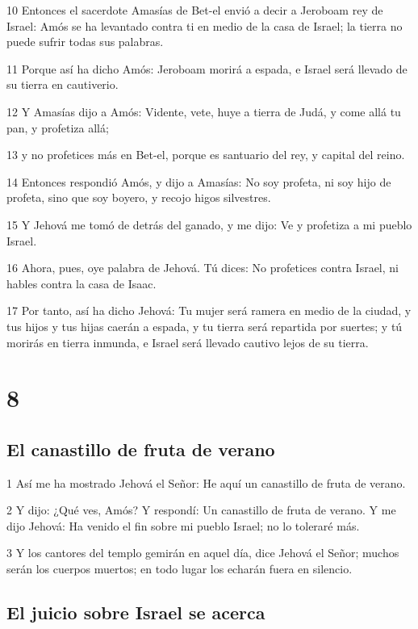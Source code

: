 \par 10 Entonces el sacerdote Amasías de Bet-el envió a decir a Jeroboam rey de Israel: Amós se ha levantado contra ti en medio de la casa de Israel; la tierra no puede sufrir todas sus palabras.
\par 11 Porque así ha dicho Amós: Jeroboam morirá a espada, e Israel será llevado de su tierra en cautiverio.
\par 12 Y Amasías dijo a Amós: Vidente, vete, huye a tierra de Judá, y come allá tu pan, y profetiza allá;
\par 13 y no profetices más en Bet-el, porque es santuario del rey, y capital del reino.
\par 14 Entonces respondió Amós, y dijo a Amasías: No soy profeta, ni soy hijo de profeta, sino que soy boyero, y recojo higos silvestres.
\par 15 Y Jehová me tomó de detrás del ganado, y me dijo: Ve y profetiza a mi pueblo Israel.
\par 16 Ahora, pues, oye palabra de Jehová. Tú dices: No profetices contra Israel, ni hables contra la casa de Isaac.
\par 17 Por tanto, así ha dicho Jehová: Tu mujer será ramera en medio de la ciudad, y tus hijos y tus hijas caerán a espada, y tu tierra será repartida por suertes; y tú morirás en tierra inmunda, e Israel será llevado cautivo lejos de su tierra.

\chapter{8}

\section*{El canastillo de fruta de verano}

\par 1 Así me ha mostrado Jehová el Señor: He aquí un canastillo de fruta de verano.
\par 2 Y dijo: ¿Qué ves, Amós? Y respondí: Un canastillo de fruta de verano. Y me dijo Jehová: Ha venido el fin sobre mi pueblo Israel; no lo toleraré más.
\par 3 Y los cantores del templo gemirán en aquel día, dice Jehová el Señor; muchos serán los cuerpos muertos; en todo lugar los echarán fuera en silencio.

\section*{El juicio sobre Israel se acerca}

